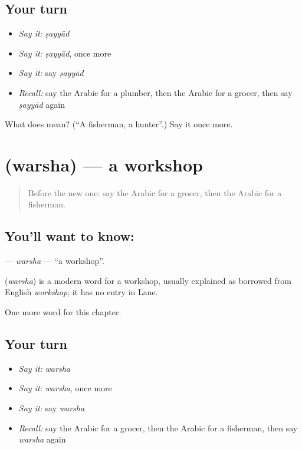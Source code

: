 \subsection*{Your turn}
\begin{itemize}
\raggedright
  \item \emph{Say it:} \emph{ṣayyād}
  \item \emph{Say it:} \emph{ṣayyād}, once more
  \item \emph{Say it:} say \emph{ṣayyād}
  \item \emph{Recall:} say the Arabic for a plumber, then the Arabic for a grocer, then say \emph{ṣayyād} again
\end{itemize}

\begin{tcolorbox}[breakable,colback=teal!4,colframe=teal!35!black,title={Before you move on}]
What does  mean? (\textquotedblleft{}A fisherman, a hunter\textquotedblright{}.) Say it once more.
\end{tcolorbox}
\section[\texorpdfstring{\ar{ورشة} (warsha)}{ورشة (warsha)}]{ (warsha) — a workshop}

\label{lesson:AR-C191-warsha}



\begin{quote}
Before the new one: say the Arabic for a grocer, then the Arabic for a fisherman.
\end{quote}

\subsection*{You'll want to know: }
\textbf{} — \emph{warsha} — \textquotedblleft{}a workshop\textquotedblright{}.

\begin{cousinweb}
\textbf{} (\emph{warsha}) is a modern word for a workshop, usually explained as borrowed from English \emph{workshop}; it has no entry in Lane.
\end{cousinweb}

\begin{grammarlens}[title={What you've built}]
One more word for this chapter.
\end{grammarlens}

\subsection*{Your turn}
\begin{itemize}
\raggedright
  \item \emph{Say it:} \emph{warsha}
  \item \emph{Say it:} \emph{warsha}, once more
  \item \emph{Say it:} say \emph{warsha}
  \item \emph{Recall:} say the Arabic for a grocer, then the Arabic for a fisherman, then say \emph{warsha} again
\end{itemize}

